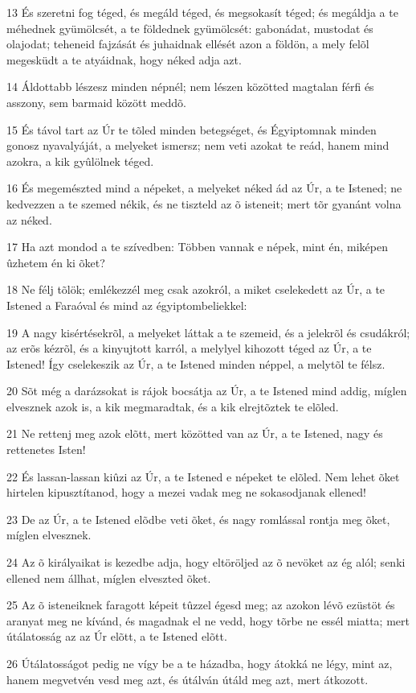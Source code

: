 \par 13 És szeretni fog téged, és megáld téged, és megsokasít téged; és megáldja a te méhednek gyümölcsét, a te földednek gyümölcsét: gabonádat, mustodat és olajodat; teheneid fajzását és juhaidnak ellését azon a földön, a mely felõl megesküdt a te atyáidnak, hogy néked adja azt.
\par 14 Áldottabb lészesz minden népnél; nem lészen közötted magtalan férfi és asszony, sem barmaid között meddõ.
\par 15 És távol tart az Úr te tõled minden betegséget, és Égyiptomnak minden gonosz nyavalyáját, a melyeket ismersz; nem veti azokat te reád, hanem mind azokra, a kik gyûlölnek téged.
\par 16 És megemészted mind a népeket, a melyeket néked ád az Úr, a te Istened; ne kedvezzen a te szemed nékik, és ne tiszteld az õ isteneit; mert tõr gyanánt volna az néked.
\par 17 Ha azt mondod a te szívedben: Többen vannak e népek, mint én, miképen ûzhetem én ki õket?
\par 18 Ne félj tõlök; emlékezzél meg csak azokról, a miket cselekedett az Úr, a te Istened a Faraóval és mind az égyiptombeliekkel:
\par 19 A nagy kisértésekrõl, a melyeket láttak a te szemeid, és a jelekrõl és csudákról; az erõs  kézrõl, és a kinyujtott karról, a melylyel kihozott téged az Úr, a te Istened! Így cselekeszik az Úr, a te Istened minden néppel, a melytõl te félsz.
\par 20 Sõt még a darázsokat is rájok bocsátja az Úr, a te Istened mind addig, míglen elvesznek azok is, a kik megmaradtak, és a kik elrejtõztek te elõled.
\par 21 Ne rettenj meg azok elõtt, mert közötted van az Úr, a te Istened, nagy és rettenetes Isten!
\par 22 És lassan-lassan kiûzi az Úr, a te Istened e népeket te elõled. Nem lehet õket hirtelen kipusztítanod, hogy a mezei vadak meg ne sokasodjanak ellened!
\par 23 De az Úr, a te Istened elõdbe veti õket, és nagy romlással rontja meg õket, míglen elvesznek.
\par 24 Az õ királyaikat is kezedbe adja, hogy eltöröljed az õ nevöket az ég alól; senki ellened nem állhat, míglen elveszted õket.
\par 25 Az õ isteneiknek faragott képeit tûzzel égesd meg; az azokon lévõ ezüstöt és aranyat meg ne kívánd, és magadnak el ne vedd, hogy tõrbe ne essél miatta; mert útálatosság az az Úr elõtt, a te Istened elõtt.
\par 26 Útálatosságot pedig ne vígy be a te házadba, hogy átokká ne légy, mint az, hanem megvetvén vesd meg azt, és útálván útáld meg azt, mert átkozott.


